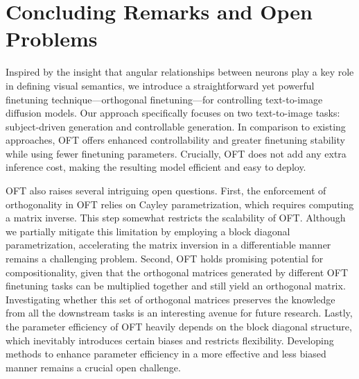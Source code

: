 \section{Concluding Remarks and Open Problems}

Inspired by the insight that angular relationships between neurons play a key role in defining visual semantics, we introduce a straightforward yet powerful finetuning technique—orthogonal finetuning—for controlling text-to-image diffusion models. Our approach specifically focuses on two text-to-image tasks: subject-driven generation and controllable generation. In comparison to existing approaches, OFT offers enhanced controllability and greater finetuning stability while using fewer finetuning parameters. Crucially, OFT does not add any extra inference cost, making the resulting model efficient and easy to deploy.

OFT also raises several intriguing open questions. First, the enforcement of orthogonality in OFT relies on Cayley parametrization, which requires computing a matrix inverse. This step somewhat restricts the scalability of OFT. Although we partially mitigate this limitation by employing a block diagonal parametrization, accelerating the matrix inversion in a differentiable manner remains a challenging problem. Second, OFT holds promising potential for compositionality, given that the orthogonal matrices generated by different OFT finetuning tasks can be multiplied together and still yield an orthogonal matrix. Investigating whether this set of orthogonal matrices preserves the knowledge from all the downstream tasks is an interesting avenue for future research. Lastly, the parameter efficiency of OFT heavily depends on the block diagonal structure, which inevitably introduces certain biases and restricts flexibility. Developing methods to enhance parameter efficiency in a more effective and less biased manner remains a crucial open challenge.

